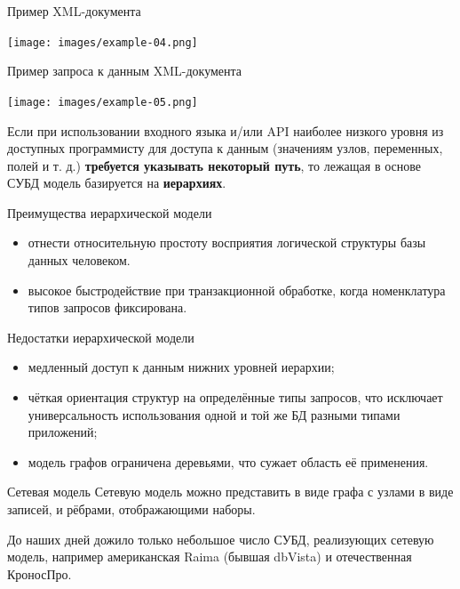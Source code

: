 \documentclass{beamer}
\begin{document}
\begin{frame}
\begin{block}{Пример XML-документа}
\begin{center}
\texttt{[image: images/example-04.png]}
\end{center}
\end{block}
\end{frame}

\begin{frame}
\begin{block}{Пример запроса к данным XML-документа}
\begin{center}
\texttt{[image: images/example-05.png]}
\end{center}
\end{block}

Если при использовании входного языка и/или API наиболее низкого уровня из доступных программисту для доступа к данным (значениям узлов, переменных, полей и т. д.) \textbf{требуется указывать некоторый путь}, то лежащая в основе СУБД модель базируется на \textbf{иерархиях}.
\end{frame}

\begin{frame}
\begin{block}{Преимущества иерархической модели}
\begin{itemize}
\item отнести относительную простоту восприятия логической структуры базы данных человеком.
\item высокое быстродействие при транзакционной обработке, когда номенклатура типов запросов фиксирована.
\end{itemize}
\end{block}
\begin{block}{Недостатки иерархической модели}
\begin{itemize}
\item медленный доступ к данным нижних уровней иерархии;
\item чёткая ориентация структур на определённые типы запросов, что исключает универсальность использования одной и той же БД разными типами приложений;
\item модель графов ограничена деревьями, что сужает область её применения.
\end{itemize}
\end{block}
\end{frame}

\begin{frame}
\begin{block}{Сетевая модель}
Сетевую модель можно представить в виде графа с узлами в виде записей, и рёбрами, отображающими наборы.
\end{block}
До наших дней дожило только небольшое число СУБД, реализующих сетевую модель, например американская Raima (бывшая dbVista) и отечественная КроносПро.
\end{frame}
\end{document}
